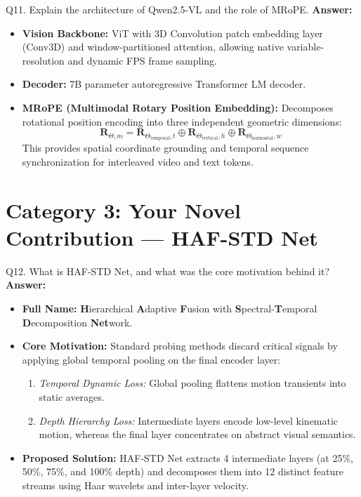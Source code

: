 \documentclass[a4paper, 11pt]{article}
\begin{document}
\begin{questionbox}{Q11. Explain the architecture of Qwen2.5-VL and the role of MRoPE.}
\textbf{Answer:}
\begin{itemize}
    \item \textbf{Vision Backbone:} ViT with 3D Convolution patch embedding layer (Conv3D) and window-partitioned attention, allowing native variable-resolution and dynamic FPS frame sampling.
    \item \textbf{Decoder:} 7B parameter autoregressive Transformer LM decoder.
    \item \textbf{MRoPE (Multimodal Rotary Position Embedding):} Decomposes rotational position encoding into three independent geometric dimensions:
    \[
    \mathbf{R}_{\Theta, m} = \mathbf{R}_{\Theta_{\text{temporal}}, t} \oplus \mathbf{R}_{\Theta_{\text{vertical}}, h} \oplus \mathbf{R}_{\Theta_{\text{horizontal}}, w}
    \]
    This provides spatial coordinate grounding and temporal sequence synchronization for interleaved video and text tokens.
\end{itemize}
\end{questionbox}

\newpage
\section{Category 3: Your Novel Contribution — HAF-STD Net}

\begin{questionbox}{Q12. What is HAF-STD Net, and what was the core motivation behind it?}
\textbf{Answer:}
\begin{itemize}
    \item \textbf{Full Name:} \textbf{H}ierarchical \textbf{A}daptive \textbf{F}usion with \textbf{S}pectral-\textbf{T}emporal \textbf{D}ecomposition \textbf{Net}work.
    \item \textbf{Core Motivation:} Standard probing methods discard critical signals by applying global temporal pooling on the final encoder layer:
    \begin{enumerate}
        \item \textit{Temporal Dynamic Loss:} Global pooling flattens motion transients into static averages.
        \item \textit{Depth Hierarchy Loss:} Intermediate layers encode low-level kinematic motion, whereas the final layer concentrates on abstract visual semantics.
    \end{enumerate}
    \item \textbf{Proposed Solution:} HAF-STD Net extracts 4 intermediate layers (at 25\%, 50\%, 75\%, and 100\% depth) and decomposes them into 12 distinct feature streams using Haar wavelets and inter-layer velocity.
\end{itemize}
\end{questionbox}
\end{document}
